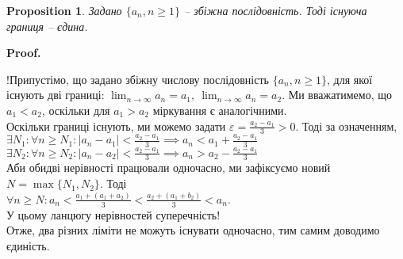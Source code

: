 \documentclass[a4paper, 14pt]{article}
\makeatletter
\def\qed{$\blacksquare$}
\theoremstyle{theoremdd}
\theoremstyle{theoremdd}
\theoremstyle{theoremdd}
\theoremstyle{theoremdd}
\theoremstyle{theoremdd}
\newtheorem{proposition}[theorem]{Proposition}
\theoremstyle{theoremdd}
\theoremstyle{theoremdd}
\theoremstyle{theoremdd}
\renewenvironment{proof}[1][Proof.\\]{\par
\pushQED{\hfill \qed}%
\normalfont \topsep6\p@\@plus6\p@\relax
\trivlist
\item\relax
{\bfseries
#1\@addpunct{.}}\hspace\labelsep\ignorespaces
}{%
\popQED\endtrivlist\@endpefalse
}
\makeatother
\begin{document}
	\begin{proposition}
	Задано $\{a_n, n \geq 1\}$ -- збіжна послідовність. Тоді існуюча границя -- єдина.
	\end{proposition}
	
	\begin{proof}
	!Припустімо, що задано збіжну числову послідовність $\{a_n, n \geq 1\}$, для якої існують дві границі: $\displaystyle \lim_{n \to \infty} a_n = a_1, \ \lim_{n \to \infty} a_n = a_2$. Ми вважатимемо, що $a_1 < a_2$, оскільки для $a_1 > a_2$ міркування є аналогічними.\\
	Оскільки границі існують, ми можемо задати $\displaystyle \varepsilon = \frac{a_2-a_1}{3} > 0$. Тоді за означенням,\\
	$\displaystyle \exists N_1: \forall n \geq N_1: |a_n-a_1|< \frac{a_2-a_1}{3} \implies a_n < a_1 + \frac{a_2-a_1}{3}$\\
	$\displaystyle \exists N_2: \forall n \geq N_2: |a_n-a_2|< \frac{a_2-a_1}{3} \implies a_n > a_2 - \frac{a_2-a_1}{3}$\\
	Аби обидві нерівності працювали одночасно, ми зафіксуємо новий $N= \max\{N_1,N_2\}$. Тоді\\
	$\displaystyle \forall n \geq N: a_n < \frac{a_1+(a_1+a_2)}{3} < \frac{a_2+(a_1+b_2)}{3}<a_n$. \\
	У цьому ланцюгу нерівностей суперечність! \\ 
	Отже, два різних ліміти не можуть існувати одночасно, тим самим доводимо єдиність.
	\end{proof}
	
\end{document}
